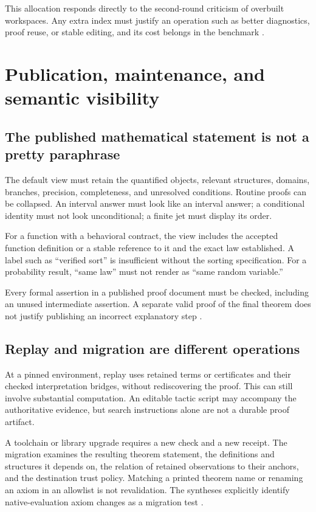 \documentclass[11pt,a4paper]{article}
\theoremstyle{definition}
\begin{document}
This allocation responds directly to the second-round criticism of overbuilt
workspaces. Any extra index must justify an operation such as better diagnostics,
proof reuse, or stable editing, and its cost belongs in the benchmark
\cite{round2a,round2b}.

\section{Publication, maintenance, and semantic visibility}\label{sec:publication}
\subsection{The published mathematical statement is not a pretty paraphrase}
The default view must retain the quantified objects, relevant structures,
domains, branches, precision, completeness, and unresolved conditions. Routine
proofs can be collapsed. An interval answer must look like an interval answer;
a conditional identity must not look unconditional; a finite jet must display
its order.

For a function with a behavioral contract, the view includes the accepted
function definition or a stable reference to it and the exact law established.
A label such as ``verified sort'' is insufficient without the sorting
specification. For a probability result, ``same law'' must not render as
``same random variable.''

Every formal assertion in a published proof document must be checked, including
an unused intermediate assertion. A separate valid proof of the final theorem
does not justify publishing an incorrect explanatory step
\cite{round2a,round2b}.

\subsection{Replay and migration are different operations}
At a pinned environment, replay uses retained terms or certificates and their
checked interpretation bridges, without rediscovering the proof. This can still
involve substantial computation. An editable tactic script may accompany the
authoritative evidence, but search instructions alone are not a durable proof
artifact.

A toolchain or library upgrade requires a new check and a new receipt. The
migration examines the resulting theorem statement, the definitions and
structures it depends on, the relation of retained observations to their
anchors, and the destination trust policy. Matching a printed theorem name or
renaming an axiom in an allowlist is not revalidation. The syntheses explicitly
identify native-evaluation axiom changes as a migration test
\cite{round2a,round2b}.
\end{document}
